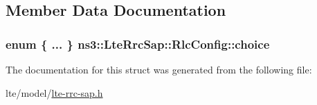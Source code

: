 \subsection{Member Data Documentation}
\subsubsection[{\texorpdfstring{choice}{choice}}]{\setlength{\rightskip}{0pt plus 5cm}enum \{ ... \}   ns3\+::\+Lte\+Rrc\+Sap\+::\+Rlc\+Config\+::choice}\hypertarget{structns3_1_1LteRrcSap_1_1RlcConfig_a9c8978e8bd86b61b3ce6209569f38245}{}\label{structns3_1_1LteRrcSap_1_1RlcConfig_a9c8978e8bd86b61b3ce6209569f38245}


The documentation for this struct was generated from the following file\+:\begin{DoxyCompactItemize}
\item 
lte/model/\hyperlink{lte-rrc-sap_8h}{lte-\/rrc-\/sap.\+h}\end{DoxyCompactItemize}

